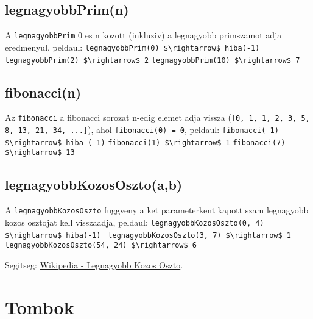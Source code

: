 \documentclass{article}
\begin{document}
\subsection{legnagyobbPrim(n)}
A \lstinline{legnagyobbPrim} 0 es n kozott (inkluziv) a legnagyobb primszamot adja eredmenyul, peldaul:\newline
\lstinline[mathescape]{legnagyobbPrim(0) $\rightarrow$ hiba(-1)}\newline
\lstinline[mathescape]{legnagyobbPrim(2) $\rightarrow$ 2}\newline
\lstinline[mathescape]{legnagyobbPrim(10) $\rightarrow$ 7}\newline

\subsection{fibonacci(n)}
Az \lstinline{fibonacci} a fibonacci sorozat n-edig elemet adja vissza \newline (\lstinline{[0, 1, 1, 2, 3, 5, 8, 13, 21, 34, ...]}), ahol \lstinline|fibonacci(0) = 0|, peldaul: \newline
\lstinline[mathescape]{fibonacci(-1) $\rightarrow$ hiba (-1)}\newline
\lstinline[mathescape]{fibonacci(1) $\rightarrow$ 1}\newline
\lstinline[mathescape]{fibonacci(7) $\rightarrow$ 13}\newline

\subsection{legnagyobbKozosOszto(a,b)}

A \lstinline{legnagyobbKozosOszto} fuggveny a ket parameterkent kapott szam legnagyobb kozos osztojat kell visszaadja, peldaul:\newline
\lstinline[mathescape]{legnagyobbKozosOszto(0, 4) $\rightarrow$ hiba(-1) }\newline
\lstinline[mathescape]{legnagyobbKozosOszto(3, 7) $\rightarrow$ 1}\newline
\lstinline[mathescape]{legnagyobbKozosOszto(54, 24) $\rightarrow$ 6}\newline

Segitseg: \href{https://hu.wikipedia.org/wiki/Legnagyobb_k\%C3\%B6z\%C3\%B6s_oszt\%C3\%B3}{Wikipedia - Legnagyobb Kozos Oszto}.

\newpage

\section{Tombok}
\end{document}
